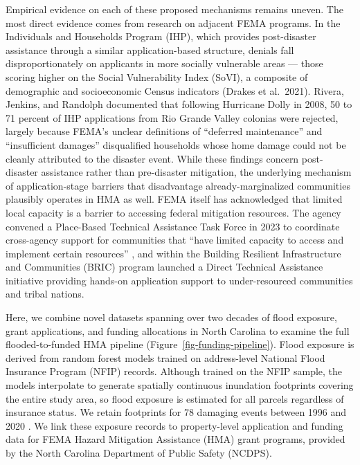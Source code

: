 \documentclass[
  authoryear,
  preprint]{elsarticle}
\begin{document}
Empirical evidence on each of these proposed mechanisms remains uneven.
The most direct evidence comes from research on adjacent FEMA programs.
In the Individuals and Households Program (IHP), which provides
post-disaster assistance through a similar application-based structure,
denials fall disproportionately on applicants in more socially
vulnerable areas --- those scoring higher on the Social Vulnerability
Index (SoVI), a composite of demographic and socioeconomic Census
indicators (Drakes et al.~2021). Rivera, Jenkins, and Randolph
\citep{riveraProceduralVulnerabilityIts2022} documented that following
Hurricane Dolly in 2008, 50 to 71 percent of IHP applications from Rio
Grande Valley colonias were rejected, largely because FEMA's unclear
definitions of ``deferred maintenance'' and ``insufficient damages''
disqualified households whose home damage could not be cleanly
attributed to the disaster event. While these findings concern
post-disaster assistance rather than pre-disaster mitigation, the
underlying mechanism of application-stage barriers that disadvantage
already-marginalized communities plausibly operates in HMA as well. FEMA
itself has acknowledged that limited local capacity is a barrier to
accessing federal mitigation resources. The agency convened a
Place-Based Technical Assistance Task Force in 2023 to coordinate
cross-agency support for communities that ``have limited capacity to
access and implement certain resources''
\citep{femaPlaceBasedTaskForce}, and within the Building Resilient
Infrastructure and Communities (BRIC) program launched a Direct
Technical Assistance initiative providing hands-on application support
to under-resourced communities and tribal nations.

Here, we combine novel datasets spanning over two decades of flood
exposure, grant applications, and funding allocations in North Carolina
to examine the full flooded-to-funded HMA pipeline
(Figure~\ref{fig-funding-pipeline}). Flood exposure is derived from
random forest models trained on address-level National Flood Insurance
Program (NFIP) records. Although trained on the NFIP sample, the models
interpolate to generate spatially continuous inundation footprints
covering the entire study area, so flood exposure is estimated for all
parcels regardless of insurance status. We retain footprints for 78
damaging events between 1996 and 2020
\citep{garciaReconstructingRepetitiveFlood2025}. We link these exposure
records to property-level application and funding data for FEMA Hazard
Mitigation Assistance (HMA) grant programs, provided by the North
Carolina Department of Public Safety (NCDPS).
\end{document}
